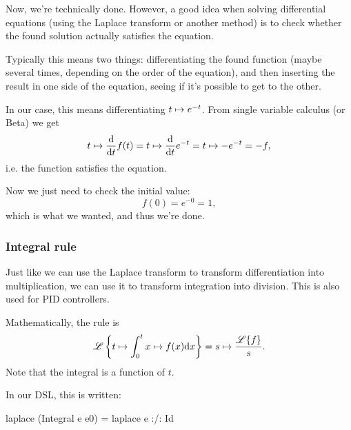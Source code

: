 \begin{solution}
Now, we're technically done. However, a good idea when solving differential
equations (using the Laplace transform or another method) is to check whether
the found solution actually satisfies the equation.

Typically this means two things: differentiating the found function (maybe
several times, depending on the order of the equation), and then inserting the
result in one side of the equation, seeing if it's possible to get to the other.

In our case, this means differentiating $t \mapsto e^{-t}$. From single variable
calculus (or Beta) we get
\begin{equation*}
 t \mapsto \dv{t} f(t) =  t \mapsto \dv{t}e^{-t}= t \mapsto -e^{-t} = -f,
\end{equation*}
i.e. the function satisfies the equation.

Now we just need to check the initial value:
\begin{equation*}
  f(0) = e^{-0} = 1,
\end{equation*}
which is what we wanted, and thus we're done.
\end{solution}

\subsubsection{Integral rule}
Just like we can use the Laplace transform to transform differentiation into
multiplication, we can use it to transform integration into division. This is
also used for PID controllers.

Mathematically, the rule is
\begin{equation*}
 \mathscr{L} \left\{t \mapsto \int_0^t x \mapsto f(x) \dd x\right\}  = s \mapsto \frac{\mathscr{L}\{f\}}{s}.
\end{equation*}
Note that the integral is a function of $t$. 

In our DSL, this is written:
\begin{code}
laplace (Integral e e0) = laplace e :/: Id 
\end{code}

